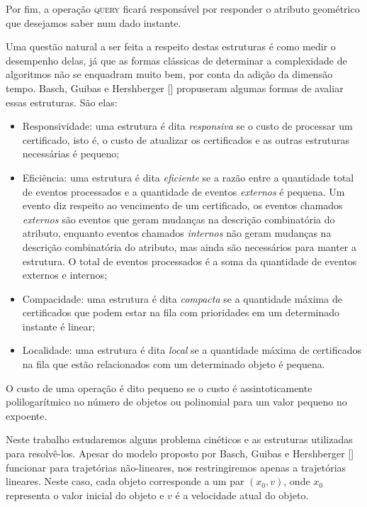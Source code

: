Por fim, a operação \textsc{query} ficará responsável por responder o atributo
geométrico que desejamos saber num dado instante.

Uma questão natural a ser feita a respeito destas estruturas é como medir o
desempenho delas, já que as formas clássicas de determinar a complexidade de
algoritmos não se enquadram muito bem, por conta da adição da dimensão tempo.
Basch, Guibas e Hershberger [\cite{BASCH19991}] propuseram algumas formas de avaliar essas
estruturas.
São elas:
\begin{itemize}
    \item Responsividade: uma estrutura é dita \textit{responsiva} se o custo de
    processar um certificado, isto é, o custo de atualizar os certificados e as
    outras estruturas necessárias é pequeno;

    \item Eficiência: uma estrutura é dita \textit{eficiente} se a razão entre a
    quantidade total de eventos processados e a quantidade de eventos
    \textit{externos} é pequena.
    Um evento diz respeito ao vencimento de um certificado, os eventos chamados
    \textit{externos} são eventos que geram mudanças na descrição combinatória do atributo,
    enquanto eventos chamados \textit{internos} não geram mudanças na descrição combinatória
    do atributo, mas ainda são necessários para manter a estrutura.
    O total de eventos processados é a soma da quantidade de eventos externos e internos;

    \item Compacidade: uma estrutura é dita \textit{compacta} se a quantidade máxima de
    certificados que podem estar na fila com prioridades em um determinado instante é linear;

    \item Localidade: uma estrutura é dita \textit{local} se a quantidade máxima
    de certificados na fila que estão relacionados com um determinado objeto é
    pequena.
\end{itemize}

O custo de uma operação é dito pequeno se o custo é assintoticamente
polilogarítmico no número de objetos ou polinomial para um valor pequeno no expoente.

Neste trabalho estudaremos alguns problema cinéticos e as estruturas utilizadas
para resolvê-los.
Apesar do modelo proposto por Basch, Guibas e Hershberger [\cite{BASCH19991}]
funcionar para trajetórias não-lineares, nos restringiremos apenas a trajetórias
lineares.
Neste caso, cada objeto corresponde a um par $(x_0, v)$, onde $x_0$ representa
o valor inicial do objeto e $v$ é a velocidade atual do objeto.

